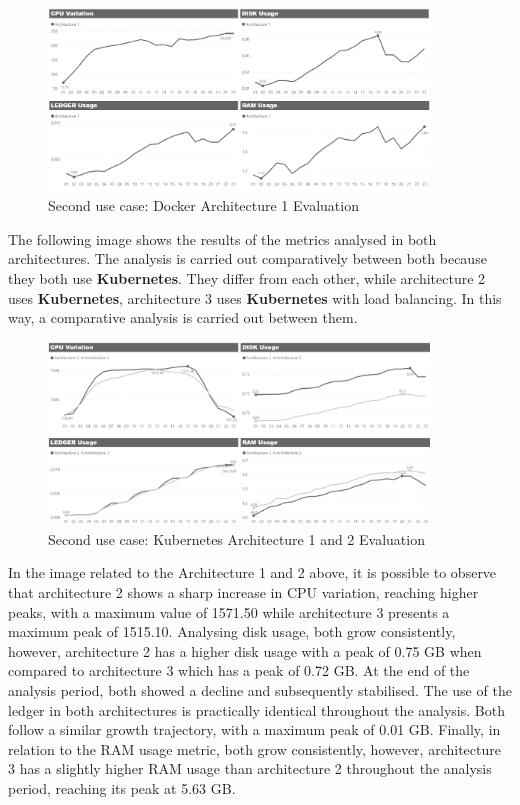 \begin{figure}[H]
	\centering
	\includegraphics[width=0.9\textwidth]{assets/use-case-2/docker-evaluation.png} %
	\caption{Second use case: Docker Architecture 1 Evaluation}
	\label{fig:sample-image} 
\end{figure}

The following image shows the results of the metrics analysed in both architectures. The analysis is carried out comparatively between both because they both use \textbf{Kubernetes}. They differ from each other, while architecture 2 uses \textbf{Kubernetes}, architecture 3 uses \textbf{Kubernetes} with load balancing. In this way, a comparative analysis is carried out between them.

\begin{figure}[H]
	\centering
	\includegraphics[width=0.9\textwidth]{assets/use-case-2/evaluation-of-k8-and-k8-with-lb.png} %
	\caption{Second use case: Kubernetes Architecture 1 and 2 Evaluation}
	\label{fig:sample-image} 
\end{figure}

In the image related to the Architecture 1 and 2 above, it is possible to observe that architecture 2 shows a sharp increase in CPU variation, reaching higher peaks, with a maximum value of 1571.50 while architecture 3 presents a maximum peak of 1515.10. 
Analysing disk usage, both grow consistently, however, architecture 2 has a higher disk usage with a peak of 0.75 GB when compared to architecture 3 which has a peak of 0.72 GB. At the end of the analysis period, both showed a decline and subsequently stabilised.
The use of the ledger in both architectures is practically identical throughout the analysis. Both follow a similar growth trajectory, with a maximum peak of 0.01 GB.
Finally, in relation to the RAM usage metric, both grow consistently, however, architecture 3 has a slightly higher RAM usage than architecture 2 throughout the analysis period, reaching its peak at 5.63 GB.



